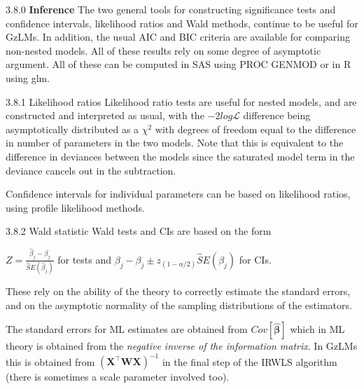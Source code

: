 \documentclass[
  9pt,
  ignorenonframetext,
]{beamer}
\begin{document}
\begin{frame}{3.8.0 \textbf{Inference}}
\protect\hypertarget{inference-1}{}
The two general tools for constructing significance tests and confidence
intervals, likelihood ratios and Wald methods, continue to be useful for
GzLMs. In addition, the usual AIC and BIC criteria are available for
comparing non-nested models. All of these results rely on some degree of
asymptotic argument. All of these can be computed in SAS using PROC
GENMOD or in R using glm.
\end{frame}

\begin{frame}{3.8.1 Likelihood ratios}
\protect\hypertarget{likelihood-ratios}{}
Likelihood ratio tests are useful for nested models, and are constructed
and interpreted as usual, with the \(-2 log \mathcal L\) difference
being asymptotically distributed as a \(\chi^2\) with degrees of freedom
equal to the difference in number of parameters in the two models. Note
that this is equivalent to the difference in deviances between the
models since the saturated model term in the deviance cancels out in the
subtraction.

Confidence intervals for individual parameters can be based on
likelihood ratios, using profile likelihood methods.
\end{frame}

\begin{frame}{3.8.2 Wald statistic}
\protect\hypertarget{wald-statistic}{}
Wald tests and CIs are based on the form

\(Z=\frac {\hat \beta_j-\beta_j}{\widehat SE(\hat \beta_j)}\) for tests
and \(\beta_j-\beta_j \pm z_{(1-\alpha/2)} \widehat SE(\beta_j)\) for
CIs.

These rely on the ability of the theory to correctly estimate the
standard errors, and on the asymptotic normality of the sampling
distributions of the estimators.

The standard errors for ML estimates are obtained from
\(Cov[\pmb {\hat \beta}]\) which in ML theory is obtained from the
\emph{negative inverse of the information matrix}. In GzLMs this is
obtained from \((\pmb {X^{\top}WX})^{-1}\) in the final step of the
IRWLS algorithm (there is sometimes a scale parameter involved too).
\end{frame}
\end{document}

